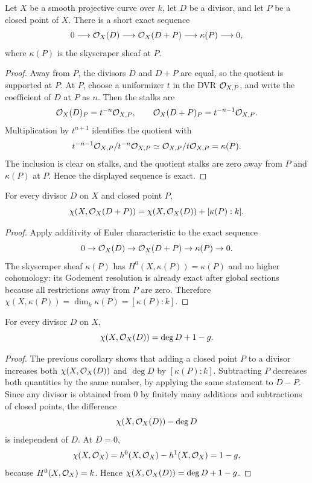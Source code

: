 \begin{proposition}
Let \(X\) be a smooth projective curve over \(k\), let \(D\) be a divisor, and
let \(P\) be a closed point of \(X\).  There is a short exact sequence
\[
    0\longrightarrow \mathcal{O}_X(D)\longrightarrow \mathcal{O}_X(D+P)
    \longrightarrow \kappa(P)\longrightarrow0,
\]
where \(\kappa(P)\) is the skyscraper sheaf at \(P\).
\end{proposition}

\begin{proof}
Away from \(P\), the divisors \(D\) and \(D+P\) are equal, so the quotient is
supported at \(P\).  At \(P\), choose a uniformizer \(t\) in the DVR
\(\mathcal{O}_{X,P}\), and write the coefficient of \(D\) at \(P\) as \(n\).  Then the
stalks are
\[
    \mathcal{O}_X(D)_P=t^{-n}\mathcal{O}_{X,P},\qquad
    \mathcal{O}_X(D+P)_P=t^{-n-1}\mathcal{O}_{X,P}.
\]
Multiplication by \(t^{n+1}\) identifies the quotient with
\[
    t^{-n-1}\mathcal{O}_{X,P}/t^{-n}\mathcal{O}_{X,P}
    \simeq
    \mathcal{O}_{X,P}/t\mathcal{O}_{X,P}
    =
    \kappa(P).
\]
The inclusion is clear on stalks, and the quotient stalks are zero away from
\(P\) and \(\kappa(P)\) at \(P\).  Hence the displayed sequence is exact.
\end{proof}

\begin{corollary}
For every divisor \(D\) on \(X\) and closed point \(P\),
\[
    \chi(X,\mathcal{O}_X(D+P))=\chi(X,\mathcal{O}_X(D))+[\kappa(P):k].
\]
\end{corollary}

\begin{proof}
Apply additivity of Euler characteristic to the exact sequence
\[
    0\to\mathcal{O}_X(D)\to\mathcal{O}_X(D+P)\to\kappa(P)\to0.
\]
The skyscraper sheaf \(\kappa(P)\) has \(H^0(X,\kappa(P))=\kappa(P)\) and no
higher cohomology: its Godement resolution is already exact after global
sections because all restrictions away from \(P\) are zero.  Therefore
\(\chi(X,\kappa(P))=\dim_k\kappa(P)=[\kappa(P):k]\).
\end{proof}

\begin{proposition}
For every divisor \(D\) on \(X\),
\[
    \chi(X,\mathcal{O}_X(D))=\deg D+1-g.
\]
\end{proposition}

\begin{proof}
The previous corollary shows that adding a closed point \(P\) to a divisor
increases both \(\chi(X,\mathcal{O}_X(D))\) and \(\deg D\) by
\([\kappa(P):k]\).  Subtracting \(P\) decreases both quantities by the same
number, by applying the same statement to \(D-P\).  Since any divisor is
obtained from \(0\) by finitely many additions and subtractions of closed
points, the difference
\[
    \chi(X,\mathcal{O}_X(D))-\deg D
\]
is independent of \(D\).  At \(D=0\),
\[
    \chi(X,\mathcal{O}_X)=h^0(X,\mathcal{O}_X)-h^1(X,\mathcal{O}_X)=1-g,
\]
because \(H^0(X,\mathcal{O}_X)=k\).  Hence
\(\chi(X,\mathcal{O}_X(D))=\deg D+1-g\).
\end{proof}

